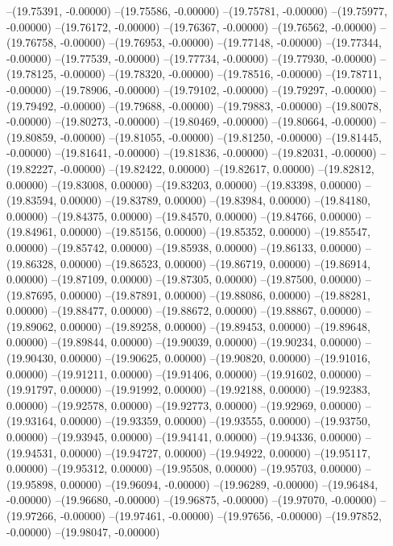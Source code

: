 --(19.75391, -0.00000)
--(19.75586, -0.00000)
--(19.75781, -0.00000)
--(19.75977, -0.00000)
--(19.76172, -0.00000)
--(19.76367, -0.00000)
--(19.76562, -0.00000)
--(19.76758, -0.00000)
--(19.76953, -0.00000)
--(19.77148, -0.00000)
--(19.77344, -0.00000)
--(19.77539, -0.00000)
--(19.77734, -0.00000)
--(19.77930, -0.00000)
--(19.78125, -0.00000)
--(19.78320, -0.00000)
--(19.78516, -0.00000)
--(19.78711, -0.00000)
--(19.78906, -0.00000)
--(19.79102, -0.00000)
--(19.79297, -0.00000)
--(19.79492, -0.00000)
--(19.79688, -0.00000)
--(19.79883, -0.00000)
--(19.80078, -0.00000)
--(19.80273, -0.00000)
--(19.80469, -0.00000)
--(19.80664, -0.00000)
--(19.80859, -0.00000)
--(19.81055, -0.00000)
--(19.81250, -0.00000)
--(19.81445, -0.00000)
--(19.81641, -0.00000)
--(19.81836, -0.00000)
--(19.82031, -0.00000)
--(19.82227, -0.00000)
--(19.82422, 0.00000)
--(19.82617, 0.00000)
--(19.82812, 0.00000)
--(19.83008, 0.00000)
--(19.83203, 0.00000)
--(19.83398, 0.00000)
--(19.83594, 0.00000)
--(19.83789, 0.00000)
--(19.83984, 0.00000)
--(19.84180, 0.00000)
--(19.84375, 0.00000)
--(19.84570, 0.00000)
--(19.84766, 0.00000)
--(19.84961, 0.00000)
--(19.85156, 0.00000)
--(19.85352, 0.00000)
--(19.85547, 0.00000)
--(19.85742, 0.00000)
--(19.85938, 0.00000)
--(19.86133, 0.00000)
--(19.86328, 0.00000)
--(19.86523, 0.00000)
--(19.86719, 0.00000)
--(19.86914, 0.00000)
--(19.87109, 0.00000)
--(19.87305, 0.00000)
--(19.87500, 0.00000)
--(19.87695, 0.00000)
--(19.87891, 0.00000)
--(19.88086, 0.00000)
--(19.88281, 0.00000)
--(19.88477, 0.00000)
--(19.88672, 0.00000)
--(19.88867, 0.00000)
--(19.89062, 0.00000)
--(19.89258, 0.00000)
--(19.89453, 0.00000)
--(19.89648, 0.00000)
--(19.89844, 0.00000)
--(19.90039, 0.00000)
--(19.90234, 0.00000)
--(19.90430, 0.00000)
--(19.90625, 0.00000)
--(19.90820, 0.00000)
--(19.91016, 0.00000)
--(19.91211, 0.00000)
--(19.91406, 0.00000)
--(19.91602, 0.00000)
--(19.91797, 0.00000)
--(19.91992, 0.00000)
--(19.92188, 0.00000)
--(19.92383, 0.00000)
--(19.92578, 0.00000)
--(19.92773, 0.00000)
--(19.92969, 0.00000)
--(19.93164, 0.00000)
--(19.93359, 0.00000)
--(19.93555, 0.00000)
--(19.93750, 0.00000)
--(19.93945, 0.00000)
--(19.94141, 0.00000)
--(19.94336, 0.00000)
--(19.94531, 0.00000)
--(19.94727, 0.00000)
--(19.94922, 0.00000)
--(19.95117, 0.00000)
--(19.95312, 0.00000)
--(19.95508, 0.00000)
--(19.95703, 0.00000)
--(19.95898, 0.00000)
--(19.96094, -0.00000)
--(19.96289, -0.00000)
--(19.96484, -0.00000)
--(19.96680, -0.00000)
--(19.96875, -0.00000)
--(19.97070, -0.00000)
--(19.97266, -0.00000)
--(19.97461, -0.00000)
--(19.97656, -0.00000)
--(19.97852, -0.00000)
--(19.98047, -0.00000)

